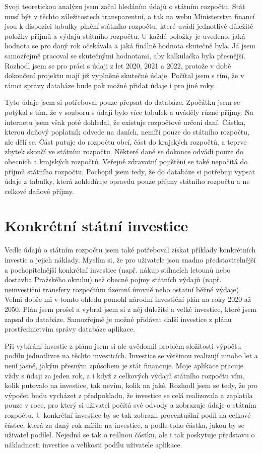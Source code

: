 \documentclass[11pt,a4paper,twoside,openright]{report}
\begin{document}
Svoji teoretickou analýzu jsem začal hledáním údajů o státním rozpočtu. Stát musí být v
těchto záležitostech transparentní, a tak na webu Ministerstva financí jsou k dispozici
tabulky plnění státního rozpočtu, které uvádí jednotlivé důležité položky příjmů a výdajů
státního rozpočtu. U každé položky je uvedeno, jaká hodnota se pro daný rok očekávala a
jaká finálně hodnota skutečně byla. Já jsem samozřejmě pracoval se skutečnými hodnotami,
aby kalkulačka byla přesnější. Rozhodl jsem se pro práci s údaji z let 2020, 2021 a 2022, 
protože v době dokončení projektu mají již vyplněné skutečné údaje. Počítal jsem s tím, že
v rámci správy databáze bude pak možné přidat údaje i pro jiné roky.

Tyto údaje jsem si potřeboval pouze přepsat do databáze. Zpočátku jsem se potýkal s tím,
že v souboru s údaji bylo více tabulek a uváděly různé příjmy. Na internetu jsem však poté
dohledal, že existuje rozpočtové určení daní. Částka, kterou daňový poplatník odvede na daních,
nemíří pouze do státního rozpočtu, ale dělí se. Část putuje do rozpočtu obcí, část do krajských
rozpočtů, a teprve zbytek skončí ve státním rozpočtu. Některé daně se dokonce odvádí pouze
do obecních a krajských rozpočtů. Veřejné zdravotní pojištění se také nepočítá do příjmů
státního rozpočtu. Pochopil jsem tedy, že do databáze si potřebuji vypsat údaje z tabulky,
která zohledňuje opravdu pouze příjmy státního rozpočtu a ne celkové daňové příjmy.

\section{Konkrétní státní investice}

Vedle údajů o státním rozpočtu jsem také potřeboval získat příklady konkrétních investic
a jejich náklady. Myslím si, že pro uživatele jsou snadno představitelnější a pochopitelnější
konkrétní investice (např. nákup stíhacích letounů nebo dostavba Pražského okruhu) než
obecné pojmy státních výdajů (např. neinvestiční transfery rozpočtům územní úrovně nebo ostatní
běžné výdaje). Velmi dobře mi v tomto ohledu pomohl národní investiční plán na roky 2020 až 2050.
Plán jsem prošel a vybral jsem si z něj důležité a velké investice, které jsem zapsal do databáze.
Samozřejmě je možné přidávat další investice z plánu prostřednictvím správy databáze aplikace.

Při vybírání investic z plánu jsem si ale uvědomil problém složitosti výpočtu podílu
jednotlivce na těchto investicích. Investice se většinou realizují mnoho let a není jasné,
jakým přesným způsobem je stát financuje. Moje aplikace pracuje vždy s údaji za jeden rok,
a i když z celkových výdajů státního rozpočtu vím, kolik putovalo na investice, tak nevím,
kolik na jaké. Rozhodl jsem se tedy, že pro výpočet budu vycházet z předpokladu, že investice
se celá realizovala a zaplatila pouze v roce, pro který si uživatel počítá své odvody a
zobrazuje údaje o státním rozpočtu. U konkrétní investice by se tak zobrazil procentuální
podíl na celkové částce, která za daný rok mířila na investice, a podle toho částka, jakou
by se uživatel podílel. Nejedná se tak o reálnou částku, ale i tak poskytuje představu o
nákladnosti investice a velikosti podílu uživatele aplikace.
\end{document}
